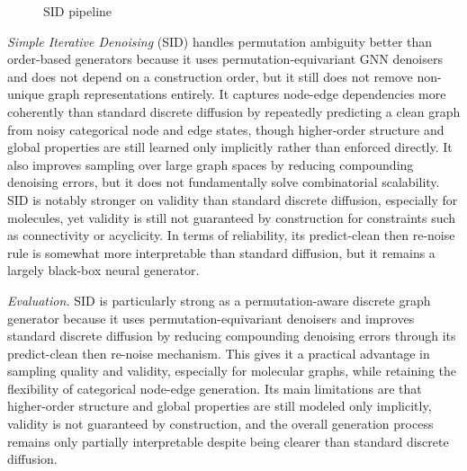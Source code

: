 \documentclass{article}
\begin{document}
\begin{figure}[htbp]
\caption{SID pipeline}
\label{fig:sid_pipeline}
\end{figure}

\emph{Simple Iterative Denoising} \cite{boget2025simple} (SID) handles permutation ambiguity better than order-based generators because it uses permutation-equivariant GNN denoisers and does not depend on a construction order, but it still does not remove non-unique graph representations entirely. It captures node-edge dependencies more coherently than standard discrete diffusion by repeatedly predicting a clean graph from noisy categorical node and edge states, though higher-order structure and global properties are still learned only implicitly rather than enforced directly. It also improves sampling over large graph spaces by reducing compounding denoising errors, but it does not fundamentally solve combinatorial scalability. SID is notably stronger on validity than standard discrete diffusion, especially for molecules, yet validity is still not guaranteed by construction for constraints such as connectivity or acyclicity. In terms of reliability, its predict-clean then re-noise rule is somewhat more interpretable than standard diffusion, but it remains a largely black-box neural generator.

\emph{Evaluation.} SID is particularly strong as a permutation-aware discrete graph generator because it uses permutation-equivariant denoisers and improves standard discrete diffusion by reducing compounding denoising errors through its predict-clean then re-noise mechanism. This gives it a practical advantage in sampling quality and validity, especially for molecular graphs, while retaining the flexibility of categorical node-edge generation. Its main limitations are that higher-order structure and global properties are still modeled only implicitly, validity is not guaranteed by construction, and the overall generation process remains only partially interpretable despite being clearer than standard discrete diffusion.
\end{document}
